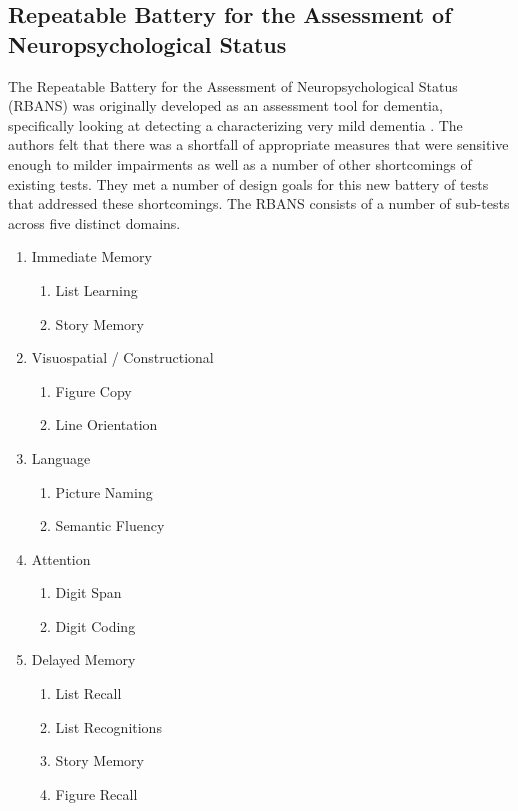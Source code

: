 \documentclass[10pt, letterpaper, twoside, openany]{thesis}
\begin{document}
\subsection{Repeatable Battery for the Assessment of Neuropsychological Status}
The Repeatable Battery for the Assessment of Neuropsychological Status (RBANS) was originally developed as an assessment tool for dementia, specifically looking at detecting a characterizing very mild dementia \cite{Randolph1998}. The authors felt that there was a shortfall of appropriate measures that were sensitive enough to milder impairments as well as a number of other shortcomings of existing tests. They met a number of design goals for this new battery of tests that addressed these shortcomings. The RBANS consists of a number of sub-tests across five distinct domains.

\begin{enumerate}
	\item Immediate Memory 
	\begin{enumerate}
		\item{List Learning}
		\item{Story Memory}
	\end{enumerate}
	\item Visuospatial / Constructional
	\begin{enumerate}
		\item{Figure Copy}
		\item{Line Orientation}
	\end{enumerate}
	\item Language
	\begin{enumerate}
		\item{Picture Naming}
		\item{Semantic Fluency}
	\end{enumerate}
	\item Attention
	\begin{enumerate}
		\item{Digit Span}
		\item{Digit Coding}
	\end{enumerate}
	\item Delayed Memory
	\begin{enumerate}
		\item{List Recall}
		\item{List Recognitions}
		\item{Story Memory}
		\item{Figure Recall}
	\end{enumerate}
\end{enumerate}
\end{document}
